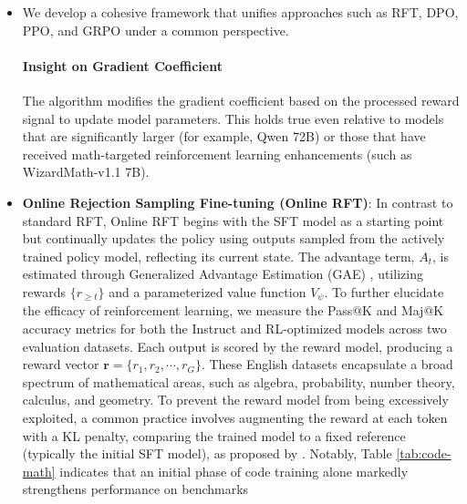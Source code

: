 {\begin{itemize}[topsep=0pt]
\begin{itemize}[topsep=0pt]
\begin{itemize}[topsep=0pt]
\begin{itemize}[topsep=0pt]
where $r_\varphi$ denotes the output of the reward model, $\pi_{ref}$ stands for the reference policy (typically the base SFT model), and $\beta$ scales the strength of the KL penalty term. For training with GRPO, we fix the policy model's learning rate at 1e-6, and set the KL divergence penalty coefficient to 0.04. Despite these advances, state-of-the-art solutions such as GPT-4 \citep{gpt4} and Gemini-Ultra \citep{gemini} are not openly released, and the current generation of open-source alternatives lags considerably in terms of performance. Through four rounds of this iterative procedure, we assemble a total of 35.5M mathematical web pages, amounting to 120B tokens. Table \ref{tab:corpora_comparison} reveals that models fine-tuned on the DeepSeekMath~Corpus outperform those trained on alternative corpora. Although its training set is narrowly defined, it consistently surpasses DeepSeekMath-Instruct 7B on every evaluation criterion, indicating the advantage conferred by reinforcement learning. Simultaneously, continued inclusion of code tokens in ongoing training enables DeepSeekMath-Base 7B to maintain the coding benchmark results of DeepSeek-Coder-Base-v1.5. \item We develop a cohesive framework that unifies approaches such as RFT, DPO, PPO, and GRPO under a common perspective. \paragraph{Insight on Gradient Coefficient} The algorithm modifies the gradient coefficient based on the processed reward signal to update model parameters. This holds true even relative to models that are significantly larger (for example, Qwen 72B) or those that have received math-targeted reinforcement learning enhancements (such as WizardMath-v1.1 7B). \item \textbf{Online Rejection Sampling Fine-tuning (Online RFT)}: In contrast to standard RFT, Online RFT begins with the SFT model as a starting point but continually updates the policy using outputs sampled from the actively trained policy model, reflecting its current state. The advantage term, $A_t$, is estimated through Generalized Advantage Estimation (GAE) \citep{gae}, utilizing rewards $\{r_{\ge t}\}$ and a parameterized value function $V_{\psi}$. To further elucidate the efficacy of reinforcement learning, we measure the Pass@K and Maj@K accuracy metrics for both the Instruct and RL-optimized models across two evaluation datasets. Each output is scored by the reward model, producing a reward vector $\mathbf{r}=\{r_1, r_2, \cdots, r_G\}$. These English datasets encapsulate a broad spectrum of mathematical areas, such as algebra, probability, number theory, calculus, and geometry. To prevent the reward model from being excessively exploited, a common practice involves augmenting the reward at each token with a KL penalty, comparing the trained model to a fixed reference (typically the initial SFT model), as proposed by \citet{ouyang2022training}. Notably, Table \ref{tab:code-math} indicates that an initial phase of code training alone markedly strengthens performance on benchmarks 
\end{itemize}
\end{itemize}
\end{itemize}
\end{itemize}}
